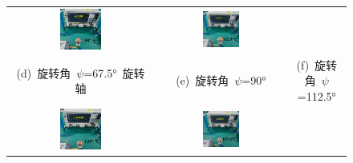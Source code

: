 \documentclass[master]{thesis-uestc}
\begin{document}
\begin{figure}[!htb]
\begin{tabular}{@{\ }c@{\ }c@{\ }c}
        \hspace{5pt}
        \includegraphics[width=0.3\textwidth]{pic/chapter5/测试旋转照片/90度.png} & 
        \hspace{5pt}
        \includegraphics[width=0.3\textwidth]{pic/chapter5/测试旋转照片/112.5度.png}     \\
        \mbox{\small (d) 旋转角 \(\psi\)=67.5° 旋转轴}                                                                               & 
        \mbox{\small (e) 旋转角 \(\psi\)=90°}  & 
        \mbox{\small (f) 旋转角 \(\psi\)=112.5°}                                                                                  \\[6bp]
        \includegraphics[width=0.3\textwidth]{pic/chapter5/测试旋转照片/135度.png} & 
        \hspace{5pt}
        \includegraphics[width=0.3\textwidth]{pic/chapter5/测试旋转照片/157.5度.png}& 

\end{tabular}
\end{figure}
\end{document}
